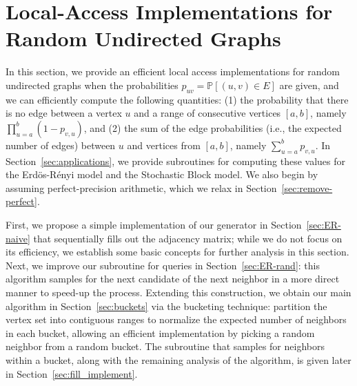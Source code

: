 \section{Local-Access Implementations for Random Undirected Graphs}
\label{sec:undirected}

In this section, we provide an efficient local access implementations for random undirected graphs
when the probabilities $p_{uv}=\mathbb P[(u,v)\in E]$ are given, and we can efficiently compute the following quantities:
(1) the probability that there is no edge between a vertex $u$ and a range of consecutive vertices $[a,b]$, namely $\prod_{u=a}^b (1-p_{v,u})$, and
(2) the sum of the edge probabilities (i.e., the expected number of edges) between $u$ and vertices from $[a,b]$, namely $\sum_{u=a}^b p_{v,u}$.
In Section~\ref{sec:applications}, we provide subroutines for computing these values for the Erd\"{o}s-R\'{e}nyi model and the Stochastic Block model.
We also begin by assuming perfect-precision arithmetic, which we relax in Section~\ref{sec:remove-perfect}.

First, we propose a simple implementation of our generator in Section~\ref{sec:ER-naive} that sequentially fills out the adjacency matrix;
while we do not focus on its efficiency, we establish some basic concepts for further analysis in this section.
Next, we improve our subroutine for  queries in Section~\ref{sec:ER-rand}:
this algorithm samples for the next candidate of the next neighbor in a more direct manner to speed-up the process.
Extending this construction, we obtain our main algorithm in Section~\ref{sec:buckets} via the bucketing technique:
partition the vertex set into contiguous ranges to normalize the expected number of neighbors in each bucket,
allowing an efficient  implementation by picking a random neighbor from a random bucket.
The subroutine that samples for neighbors within a bucket, along with the remaining analysis of the algorithm,
is given later in Section~\ref{sec:fill_implement}.

\iffalse
{\color{blue}
Alternatively, we provide an implementation for these two models with a deterministic performance guarantee in Section~\ref{sec:ER-det}.
In this setting, introducing the \func{Vertex-Pair} queries results in an amortized guarantee on the run-time.
The deterministic guarantee comes at the cost of more complicated data-structures
(we use a two-level nested interval tree and binary search tree).
}
\fi




